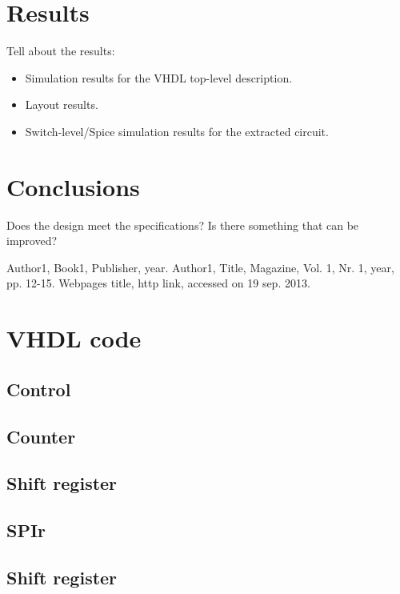 \documentclass[11pt,twoside,a4paper]{article}
\begin{document}
\section{Results}
Tell about the results:
\begin{itemize}
\item
Simulation results for the VHDL top-level description.
\item
Layout results.
\item
Switch-level/Spice simulation results for the extracted circuit.
\end{itemize}

\section{Conclusions}
Does the design meet the specifications?
Is there something that can be improved?

\begin{thebibliography}{9}
Author1, 
Book1, 
Publisher, 
year.
Author1, 
Title, 
Magazine, 
Vol. 1, 
Nr. 1, 
year, 
pp. 12-15.
Webpages title, 
http link, 
accessed on 19 sep. 2013.
\end{thebibliography}

\section{VHDL code}
\subsection{Control}
\label{control-vhdl}
 
\subsection{Counter}
\label{counter-vhdl}
 
\subsection{Shift register}
\label{shift-reg-vhdl}
 
\subsection{SPIr}
\label{spi-vhdl}
 
\subsection{Shift register}
\label{spi-tb-vhdl}
 
\end{document}
